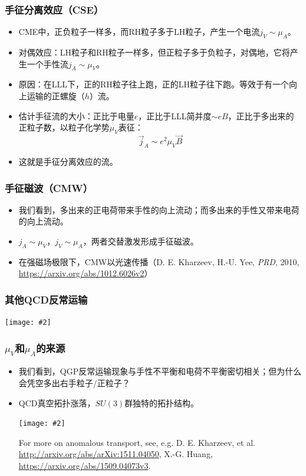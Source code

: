 \documentclass[aspectratio=1610,14pt,matheuler]{beamer}
\newcommand{\bch}{}
\newcommand{\ech}{}
\newcommand{\cpic}[2]{
\begin{center}
\texttt{[image: \#2]}
\end{center}
}
\begin{document}
\begin{frame}
\frametitle{\bch 手征分离效应（CSE） \ech}
\bch
\begin{itemize}
\item
CME中，正负粒子一样多，而RH粒子多于LH粒子，产生一个电流$j_V \sim \mu_A$。
\item
对偶效应：LH粒子和RH粒子一样多，但正粒子多于负粒子，对偶地，它将产生一个手性流$j_A\sim \mu_V$。
\item
原因：在LLL下，正的RH粒子往上跑，正的LH粒子往下跑。等效于有一个向上运输的正螺旋（$h$）流。
\item
估计手征流的大小：正比于电量$e$，正比于LLL简并度$\sim eB$，正比于多出来的正粒子数，以粒子化学势$\mu_V$表征：{\color{blue}
$$
\vec j_A \sim e^2  \mu_V \vec B
$$
}
\item
这就是手征分离效应的流。
\end{itemize}
\ech
\end{frame}

\begin{frame}
\frametitle{\bch 手征磁波（CMW） \ech}
\bch
\begin{itemize}
\item 我们看到，多出来的正电荷带来手性的向上流动；而多出来的手性又带来电荷的向上流动。
\item $j_A \sim \mu_V$，$j_V \sim \mu_A$，{\color{blue}两者交替激发形成手征磁波。}
\item 在强磁场极限下，CMW以光速传播（D. E. Kharzeev, H.-U. Yee, \emph{PRD}, 2010, {\color{olive}\url{https://arxiv.org/abs/1012.6026v2}}）
\end{itemize}
\ech
\end{frame}

\begin{frame}
\frametitle{\bch 其他QCD反常运输 \ech}
\bch
\cpic{0.21}{at}
\ech
\end{frame}

\begin{frame}
\frametitle{\bch $\mu_V$和$\mu_A$的来源 \ech}
\bch
\begin{itemize}
\item 我们看到，QGP反常运输现象与手性不平衡和电荷不平衡密切相关；但为什么会凭空多出右手粒子/正粒子？
\item QCD真空拓扑涨落，$SU(3)$群独特的拓扑结构。
\cpic{0.26}{mu_a}
{\tiny For more on anomalous transport, see, e.g. D. E. Kharzeev, et al. {\color{olive}\url{http://arxiv.org/abs/arXiv:1511.04050}}, X.-G. Huang,{\color{olive} \url{https://arxiv.org/abs/1509.04073v3}}.}
\end{itemize}
\ech
\end{frame}
\end{document}
